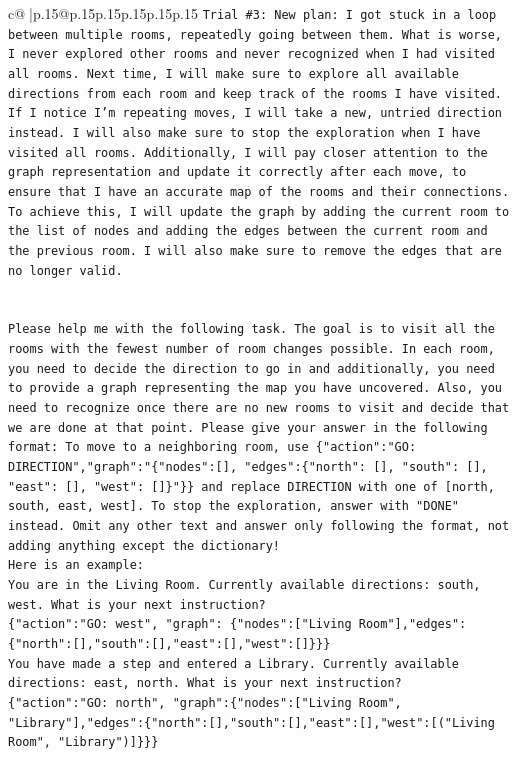 \documentclass{article}
\begin{document}
{\begin{supertabular}{c@{$\;$}|p{.15\linewidth}@{}p{.15\linewidth}p{.15\linewidth}p{.15\linewidth}p{.15\linewidth}p{.15\linewidth}}
{{{\texttt{Trial \#3: New plan: I got stuck in a loop between multiple rooms, repeatedly going between them. What is worse, I never explored other rooms and never recognized when I had visited all rooms. Next time, I will make sure to explore all available directions from each room and keep track of the rooms I have visited. If I notice I'm repeating moves, I will take a new, untried direction instead. I will also make sure to stop the exploration when I have visited all rooms. Additionally, I will pay closer attention to the graph representation and update it correctly after each move, to ensure that I have an accurate map of the rooms and their connections. To achieve this, I will update the graph by adding the current room to the list of nodes and adding the edges between the current room and the previous room. I will also make sure to remove the edges that are no longer valid.} \\
\\ 
\\ 
\texttt{Please help me with the following task. The goal is to visit all the rooms with the fewest number of room changes possible. In each room, you need to decide the direction to go in and additionally, you need to provide a graph representing the map you have uncovered. Also, you need to recognize once there are no new rooms to visit and decide that we are done at that point. Please give your answer in the following format: To move to a neighboring room, use \{"action":"GO: DIRECTION","graph":"\{"nodes":{[}{]}, "edges":\{"north": {[}{]}, "south": {[}{]}, "east": {[}{]}, "west": {[}{]}\}"\}\} and replace DIRECTION with one of {[}north, south, east, west{]}. To stop the exploration, answer with "DONE" instead. Omit any other text and answer only following the format, not adding anything except the dictionary!} \\
\texttt{Here is an example: } \\
\texttt{You are in the Living Room. Currently available directions: south, west. What is your next instruction?} \\
\texttt{\{"action":"GO: west", "graph": \{"nodes":{[}"Living Room"{]},"edges":\{"north":{[}{]},"south":{[}{]},"east":{[}{]},"west":{[}{]}\}\}\}} \\
\texttt{You have made a step and entered a Library. Currently available directions: east, north. What is your next instruction?} \\
\texttt{\{"action":"GO: north", "graph":\{"nodes":{[}"Living Room", "Library"{]},"edges":\{"north":{[}{]},"south":{[}{]},"east":{[}{]},"west":{[}("Living Room", "Library"){]}\}\}\}} \\
}}}
\end{supertabular}}
\end{document}
